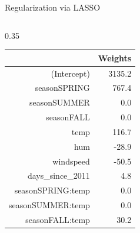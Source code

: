 \documentclass[10pt,compress,t,notes=noshow, xcolor=table]{beamer}
\begin{document}
\begin{frame}{Regularization via LASSO }
\begin{columns}[c, totalwidth=\textwidth]
\begin{column}{0.35\textwidth}
\scriptsize
\centering
\begin{tabular}{rr}
  \hline
 & Weights \\ 
  \hline
(Intercept) & 3135.2 \\ 
  seasonSPRING & 767.4 \\ 
  seasonSUMMER & 0.0 \\ 
  seasonFALL & 0.0 \\ 
  temp & 116.7 \\ 
  hum & -28.9 \\ 
  windspeed & -50.5 \\ 
  days\_since\_2011 & 4.8 \\ 
  \hline
  seasonSPRING:temp & 0.0 \\ 
  seasonSUMMER:temp & 0.0 \\ 
  seasonFALL:temp & 30.2 \\ 
   \hline
\end{tabular}
\end{column}
\end{columns}




\end{frame}
\endlecture
\end{document}
